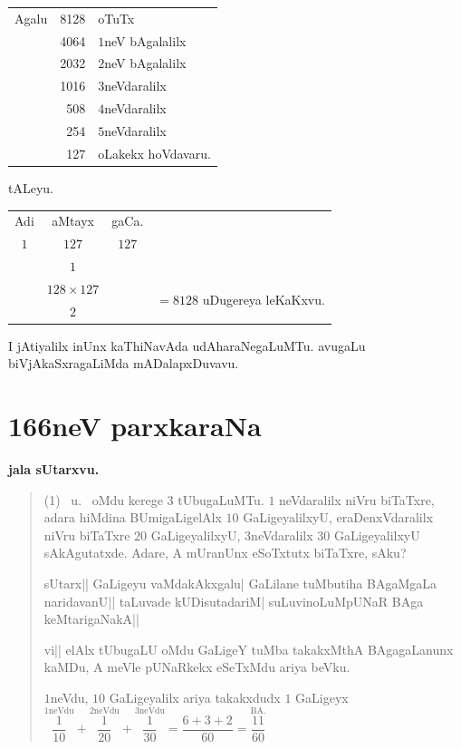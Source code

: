 \noindent
\begin{minipage}[c]{5cm}
\begin{center}
\begin{tabular}{r>{\rm}rl}
Agalu & 8128 & oTuTx\\[2pt]
\cline{2-2}
      & 4064 & $1$neV bAgalalilx\\
      & 2032 & $2$neV bAgalalilx\\
      & 1016 & $3$neVdaralilx\\
      & 508 & $4$neVdaralilx\\
      & 254 & $5$neVdaralilx\\
\cline{2-2}
      & 127 & oLakekx hoVdavaru.
\end{tabular}
\end{center}
\end{minipage}
\qquad
\begin{minipage}[c]{5.5cm}
\centerline{tALeyu.}
\medskip
\begin{center}
\begin{tabular}{ccc@{\kern -10pt}l}
Adi & aMtayx & gaCa.\\
$1$ & $127$ & $127$\\
    & $1$ &\\
\cline{2-2}
    & $128\times 127$ && \multirow{2}{5cm}{$=8128$ uDugereya leKaKxvu.}\\
\cline{2-2}
    & $2$ & 
\end{tabular}
\end{center}
\end{minipage}

\smallskip

I jAtiyalilx inUnx kaThiNavAda udAharaNegaLuMTu. avugaLu
biVjAkaSxragaLiMda mADalapxDuvavu.


\chapter{166neV parxkaraNa}

\begin{center}
{\large\bf jala sUtarxvu.}
\end{center}

\begin{verse}
{\rm(1)}~ u.~ oMdu kerege $3$ tUbugaLuMTu. $1$ neVdaralilx niVru
biTaTxre, adara hiMdina BUmigaLigelAlx $10$ GaLigeyalilxyU,
eraDenxVdaralilx niVru biTaTxre $20$ GaLigeyalilxyU, $3$neVdaralilx
$30$ GaLigeyalilxyU sAkAgutatxde. Adare, A mUranUnx eSoTxtutx
biTaTxre, sAku?

sUtarx|| GaLigeyu vaMdakAkxgalu| GaLilane tuMbutiha BAgaMgaLa
naridavanU|| taLuvade kUDisutadariM| suLuvinoLuMpUNaR BAga
keMtarigaNakA||

vi|| elAlx tUbugaLU oMdu GaLigeY tuMba takakxMthA BAgagaLanunx kaMDu,
A meVle pUNaRkekx eSeTxMdu ariya beVku.

$1$neVdu, $10$ GaLigeyalilx ariya takakxdudx $1$ GaLigeyx
$\overset{1\text{neVdu}}{\dfrac{1}{10}}+\overset{2\text{neVdu}}{\dfrac{1}{20}}+\overset{3\text{neVdu}}{\dfrac{1}{30}}=\dfrac{6+3+2}{60}=\overset{\text{BA.}}{\dfrac{11}{60}}$ 
\end{verse}

